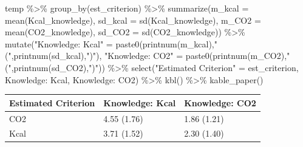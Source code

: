 \documentclass[
  letterpaper,
  DIV=11,
  numbers=noendperiod]{scrartcl}
\newenvironment{Shaded}{\begin{snugshade}}{\end{snugshade}}
\newcommand{\AttributeTok}[1]{\textcolor[rgb]{0.40,0.45,0.13}{#1}}
\newcommand{\FunctionTok}[1]{\textcolor[rgb]{0.28,0.35,0.67}{#1}}
\newcommand{\NormalTok}[1]{\textcolor[rgb]{0.00,0.23,0.31}{#1}}
\newcommand{\OtherTok}[1]{\textcolor[rgb]{0.00,0.23,0.31}{#1}}
\newcommand{\SpecialCharTok}[1]{\textcolor[rgb]{0.37,0.37,0.37}{#1}}
\newcommand{\StringTok}[1]{\textcolor[rgb]{0.13,0.47,0.30}{#1}}
\begin{document}
\begin{Shaded}
\begin{Highlighting}[]
\NormalTok{temp }\SpecialCharTok{\%\textgreater{}\%} 
  \FunctionTok{group\_by}\NormalTok{(est\_criterion) }\SpecialCharTok{\%\textgreater{}\%} 
  \FunctionTok{summarize}\NormalTok{(}\AttributeTok{m\_kcal  =} \FunctionTok{mean}\NormalTok{(Kcal\_knowledge),}
            \AttributeTok{sd\_kcal =} \FunctionTok{sd}\NormalTok{(Kcal\_knowledge),}
            \AttributeTok{m\_CO2   =} \FunctionTok{mean}\NormalTok{(CO2\_knowledge),}
            \AttributeTok{sd\_CO2  =} \FunctionTok{sd}\NormalTok{(CO2\_knowledge)) }\SpecialCharTok{\%\textgreater{}\%} 
  \FunctionTok{mutate}\NormalTok{(}\StringTok{"Knowledge: Kcal"} \OtherTok{=} \FunctionTok{paste0}\NormalTok{(}\FunctionTok{printnum}\NormalTok{(m\_kcal),}\StringTok{" ("}\NormalTok{,}\FunctionTok{printnum}\NormalTok{(sd\_kcal),}\StringTok{")"}\NormalTok{),}
         \StringTok{"Knowledge: CO2"} \OtherTok{=} \FunctionTok{paste0}\NormalTok{(}\FunctionTok{printnum}\NormalTok{(m\_CO2),}\StringTok{" ("}\NormalTok{,}\FunctionTok{printnum}\NormalTok{(sd\_CO2),}\StringTok{")"}\NormalTok{)) }\SpecialCharTok{\%\textgreater{}\%} 
  \FunctionTok{select}\NormalTok{(}\StringTok{"Estimated Criterion"} \OtherTok{=}\NormalTok{ est\_criterion, }\StringTok{\textasciigrave{}}\AttributeTok{Knowledge: Kcal}\StringTok{\textasciigrave{}}\NormalTok{, }\StringTok{\textasciigrave{}}\AttributeTok{Knowledge: CO2}\StringTok{\textasciigrave{}}\NormalTok{) }\SpecialCharTok{\%\textgreater{}\%} 
  \FunctionTok{kbl}\NormalTok{() }\SpecialCharTok{\%\textgreater{}\%} 
  \FunctionTok{kable\_paper}\NormalTok{()}
\end{Highlighting}
\end{Shaded}

\begin{table}
\centering
\begin{tabular}[t]{l|l|l}
\hline
Estimated Criterion & Knowledge: Kcal & Knowledge: CO2\\
\hline
CO2 & 4.55 (1.76) & 1.86 (1.21)\\
\hline
Kcal & 3.71 (1.52) & 2.30 (1.40)\\
\hline
\end{tabular}
\end{table}
\end{document}
